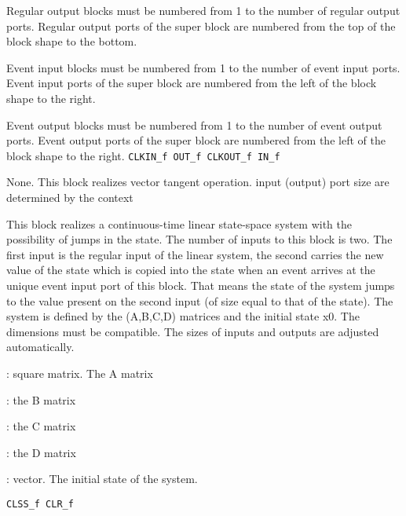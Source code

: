 Regular output blocks must be numbered from 1 to the number of regular
output ports. Regular output ports of the super block are numbered
from the top of the block shape to the bottom.
\par\noindent

Event input blocks must be numbered from 1 to the number of event
input ports. Event input ports of the super block are numbered from
the left of the block shape to the right.
\par\noindent
Event output blocks must be numbered from 1 to the number of event
output ports. Event output ports of the super block are numbered from
the left of the block shape to the right.
{\verb?CLKIN_f OUT_f CLKOUT_f IN_f?} \pageref{CLKINfOUTfCLKOUTfINf}








%
%


\label{TANBLKf}

None.
This block realizes vector tangent operation.
input (output) port size are determined by the context









%
%


\label{TCLSSf}

This block realizes a continuous-time linear state-space system
with the possibility of jumps in the state. The number of inputs
to this block is two. The first input is the regular input of the
linear system, the second carries the new value of the state which
is copied into the state when an event arrives at the unique event 
input port of this block. That means the state of the system jumps 
to the value present on the second input (of size equal to that of
the state).
The system is defined by the (A,B,C,D) matrices and the initial
state x0. The dimensions must be compatible. The sizes of inputs
and outputs are adjusted automatically.
\begin{scitem}
\item[{\verb?A?}]
: square matrix. The A matrix
\item[{\verb?B?}]
: the B matrix
\item[{\verb?C?}]
: the C matrix
\item[{\verb?D?}]
: the D matrix
\item[{\verb?x0?}]
: vector. The initial state of the system.
\end{scitem}%
{\verb?CLSS_f CLR_f ?} \pageref{CLSSfCLRf}





